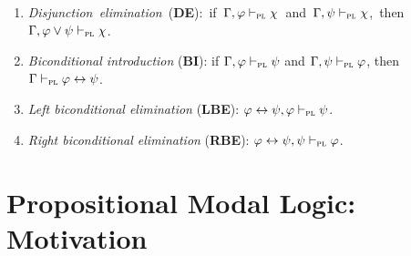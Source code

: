 \documentclass[a4paper, 11pt]{article} %
\begin{document}
\begin{enumerate}[itemsep=2pt]
	\item \mbox{\textit{Disjunction elimination} (\textbf{DE}): if $\Gamma, \varphi \vdash_{\textsc{pl}} \chi$ and $\Gamma, \psi \vdash_{\textsc{pl}} \chi$, then $\Gamma, \varphi \vee \psi \vdash_{\textsc{pl}} \chi$.}
	\item \textit{Biconditional introduction} (\textbf{BI}): if $\Gamma, \varphi \vdash_{\textsc{pl}} \psi$ and $\Gamma, \psi \vdash_{\textsc{pl}} \varphi$, then $\Gamma \vdash_{\textsc{pl}} \varphi \leftrightarrow \psi$.
	\item \textit{Left biconditional elimination} (\textbf{LBE}): $\varphi \leftrightarrow \psi, \varphi \vdash_{\textsc{pl}} \psi$.
	\item \textit{Right biconditional elimination} (\textbf{RBE}): $\varphi \leftrightarrow \psi, \psi \vdash_{\textsc{pl}} \varphi$.
\end{enumerate}





\section*{\sc Propositional Modal Logic: Motivation}
\end{document}
